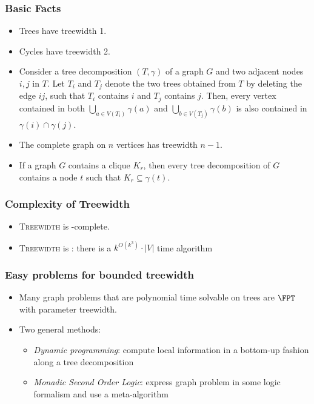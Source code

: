 \begin{frame}
  \frametitle{Basic Facts}
  \begin{itemize}
  \item Trees have treewidth 1.
  \item Cycles have treewidth 2.
  \item Consider a tree decomposition $(T,\gamma )$ of a graph $G$ and two adjacent nodes $i,j$ in $T$. Let $T_i$ and $T_j$ denote the two trees obtained from $T$ by deleting the edge $ij$, such that $T_i$ contains $i$ and $T_j$ contains $j$. Then, every vertex contained in both $\bigcup_{a\in V(T_i)} \gamma(a)$ and $\bigcup_{b\in V(T_j)} \gamma(b)$ is also contained in $\gamma(i) \cap \gamma(j)$.
  \item The complete graph on $n$ vertices has treewidth $n-1$.
  \item If a graph $G$ contains a clique $K_r$, then every tree
    decomposition of $G$ contains a node $t$ such that $K_r\subseteq
    \gamma(t)$.%

  \end{itemize}
\end{frame}



\begin{frame} 
  \frametitle{Complexity of Treewidth}
  
  
  \begin{itemize}
   \item \textsc{Treewidth} is \NP-complete. %
   \item \textsc{Treewidth} is \FPT: there is a $k^{O(k^3)}\cdot |V|$ time algorithm \cite{Bodlaender96}
  \end{itemize}
\end{frame}



\begin{frame}
  \frametitle{Easy problems for bounded treewidth}
  \begin{itemize}
   \item Many graph problems that are polynomial time solvable on trees
    are $\FPT$ with parameter treewidth.
   \item Two general methods:
   \begin{itemize}
    \item \emph{Dynamic programming}: compute local information in a bottom-up
    fashion along a tree decomposition
    \item \emph{Monadic Second Order Logic}: express graph problem in some
    logic formalism and use a meta-algorithm
   \end{itemize}

  \end{itemize}
\end{frame}

